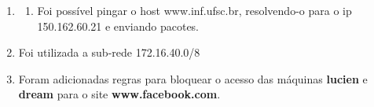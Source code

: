 \documentclass[a4paper, 12pt]{article}
\begin{document}
\begin{enumerate}
\begin{enumerate}
\end{enumerate}

\item 
\begin{enumerate}

\item Foi possível pingar o host www.inf.ufsc.br, resolvendo-o para o
  ip 150.162.60.21 e enviando pacotes.

\end{enumerate}


\item Foi utilizada a sub-rede 172.16.40.0/8

\item Foram adicionadas regras para bloquear o acesso das máquinas
  {\bf lucien} e {\bf dream} para o site {\bf
    www.facebook.com}. 

\end{enumerate}
\end{document}
